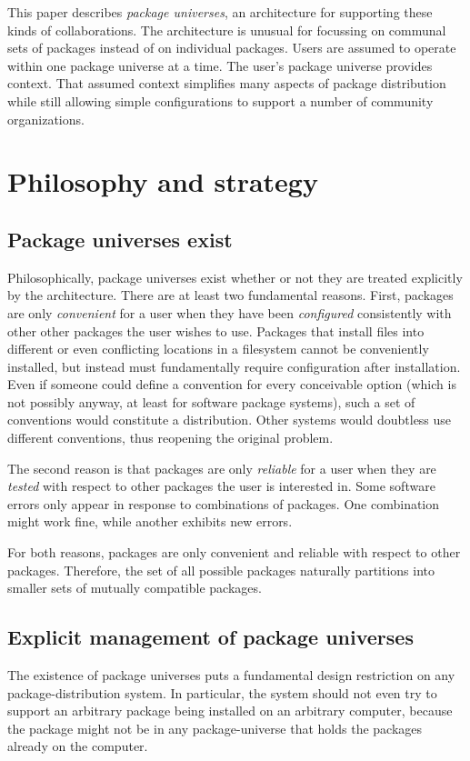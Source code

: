 \documentclass{article}
\begin{document}
This paper describes \emph{package universes}, an architecture for
supporting these kinds of collaborations.  The architecture is unusual
for focussing on communal sets of packages instead of on individual
packages.  Users are assumed to operate within one package universe at
a time.  The user's package universe provides context.  That assumed
context simplifies many aspects of package distribution while still
allowing simple configurations to support a number of community
organizations.


\section{Philosophy and strategy}

\subsection{Package universes exist}
Philosophically, package universes exist whether or not they are
treated explicitly by the architecture.  There are at least two
fundamental reasons.  First, packages are only \emph{convenient} for a
user when they have been \emph{configured} consistently with other
other packages the user wishes to use.  Packages that install files
into different or even conflicting locations in a filesystem cannot be
conveniently installed, but instead must fundamentally require
configuration after installation.  Even if someone could define a
convention for every conceivable option (which is not possibly anyway,
at least for software package systems), such a set of conventions
would constitute a distribution.  Other systems would doubtless use
different conventions, thus reopening the original problem.

The second reason is that packages are only \emph{reliable} for a user
when they are \emph{tested} with respect to other packages the user is
interested in.  Some software errors only appear in response to
combinations of packages.  One combination might work fine, while
another exhibits new errors.

For both reasons, packages are only convenient and reliable with
respect to other packages.  Therefore, the set of all possible
packages naturally partitions into smaller sets of mutually compatible
packages.


\subsection{Explicit management of package universes}
The existence of package universes puts a fundamental design
restriction on any package-distribution system.  In particular, the
system should not even try to support an arbitrary package being
installed on an arbitrary computer, because the package might not be
in any package-universe that holds the packages already on the
computer.
\end{document}

